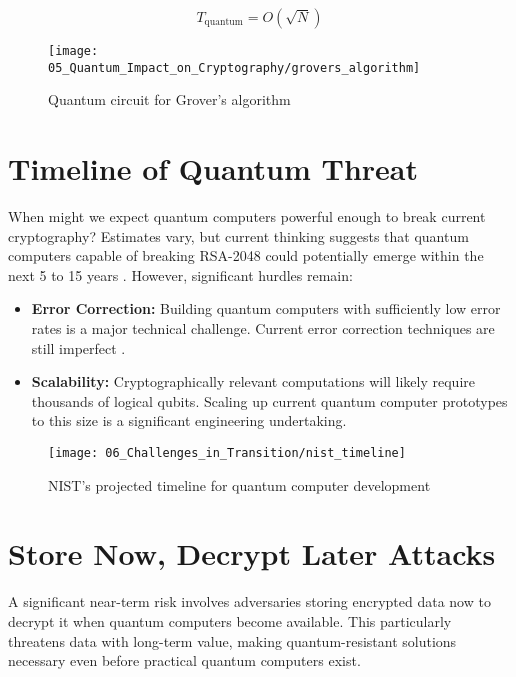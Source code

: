 \begin{equation}\label{eq:grover_speedup}
    T_{\text{quantum}} = O(\sqrt{N})
\end{equation}

\begin{figure}[h]
    \centering
    \texttt{[image: 05\_Quantum\_Impact\_on\_Cryptography/grovers\_algorithm]}
    \caption{Quantum circuit for Grover's algorithm}
    \label{fig:grover_circuit}
\end{figure}

\section{Timeline of Quantum Threat}\label{sec:timeline}

When might we expect quantum computers powerful enough to break current cryptography?  Estimates vary, but current thinking suggests that quantum computers capable of breaking RSA-2048 could potentially emerge within the next 5 to 15 years \parencite{mosca2018cybersecurity}.  However, significant hurdles remain:

\begin{itemize}
    \item \textbf{Error Correction:} Building quantum computers with sufficiently low error rates is a major technical challenge. Current error correction techniques are still imperfect \parencite{preskill2018quantum}.
    \item \textbf{Scalability:} Cryptographically relevant computations will likely require thousands of logical qubits. Scaling up current quantum computer prototypes to this size is a significant engineering undertaking.
\end{itemize}

\begin{figure}[h]
    \centering
    \texttt{[image: 06\_Challenges\_in\_Transition/nist\_timeline]}
    \caption{NIST's projected timeline for quantum computer development}
    \label{fig:nist_timeline}
\end{figure}

\section{Store Now, Decrypt Later Attacks}

A significant near-term risk involves adversaries storing encrypted data now to decrypt it when quantum computers become available. This particularly threatens data with long-term value, making quantum-resistant solutions necessary even before practical quantum computers exist.

